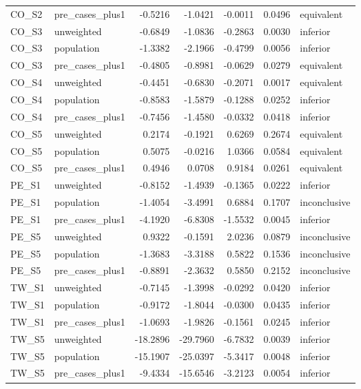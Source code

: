 \begin{tabular}{llrrrrl}
CO\_S2 & pre\_cases\_plus1 & -0.5216 & -1.0421 & -0.0011 & 0.0496 & equivalent \\
CO\_S3 & unweighted & -0.6849 & -1.0836 & -0.2863 & 0.0030 & inferior \\
CO\_S3 & population & -1.3382 & -2.1966 & -0.4799 & 0.0056 & inferior \\
CO\_S3 & pre\_cases\_plus1 & -0.4805 & -0.8981 & -0.0629 & 0.0279 & equivalent \\
CO\_S4 & unweighted & -0.4451 & -0.6830 & -0.2071 & 0.0017 & equivalent \\
CO\_S4 & population & -0.8583 & -1.5879 & -0.1288 & 0.0252 & inferior \\
CO\_S4 & pre\_cases\_plus1 & -0.7456 & -1.4580 & -0.0332 & 0.0418 & inferior \\
CO\_S5 & unweighted & 0.2174 & -0.1921 & 0.6269 & 0.2674 & equivalent \\
CO\_S5 & population & 0.5075 & -0.0216 & 1.0366 & 0.0584 & equivalent \\
CO\_S5 & pre\_cases\_plus1 & 0.4946 & 0.0708 & 0.9184 & 0.0261 & equivalent \\
PE\_S1 & unweighted & -0.8152 & -1.4939 & -0.1365 & 0.0222 & inferior \\
PE\_S1 & population & -1.4054 & -3.4991 & 0.6884 & 0.1707 & inconclusive \\
PE\_S1 & pre\_cases\_plus1 & -4.1920 & -6.8308 & -1.5532 & 0.0045 & inferior \\
PE\_S5 & unweighted & 0.9322 & -0.1591 & 2.0236 & 0.0879 & inconclusive \\
PE\_S5 & population & -1.3683 & -3.3188 & 0.5822 & 0.1536 & inconclusive \\
PE\_S5 & pre\_cases\_plus1 & -0.8891 & -2.3632 & 0.5850 & 0.2152 & inconclusive \\
TW\_S1 & unweighted & -0.7145 & -1.3998 & -0.0292 & 0.0420 & inferior \\
TW\_S1 & population & -0.9172 & -1.8044 & -0.0300 & 0.0435 & inferior \\
TW\_S1 & pre\_cases\_plus1 & -1.0693 & -1.9826 & -0.1561 & 0.0245 & inferior \\
TW\_S5 & unweighted & -18.2896 & -29.7960 & -6.7832 & 0.0039 & inferior \\
TW\_S5 & population & -15.1907 & -25.0397 & -5.3417 & 0.0048 & inferior \\
TW\_S5 & pre\_cases\_plus1 & -9.4334 & -15.6546 & -3.2123 & 0.0054 & inferior \\
\bottomrule
\end{tabular}

